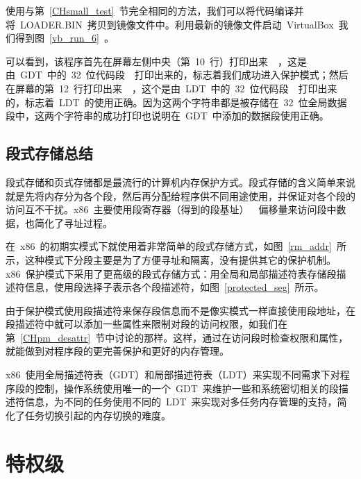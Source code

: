 使用与第~\ref{CHsmall_test}~节完全相同的方法，我们可以将代码编译并将~LOADER.BIN~拷贝到镜像文件中。利用最新的镜像文件启动~VirtualBox~我们得到图~\ref{vb_run_6}~。


可以看到，该程序首先在屏幕左侧中央（第~10~行）打印出来~~，这是由~GDT~中的~32~位代码段~~打印出来的，标志着我们成功进入保护模式；然后在屏幕的第~12~行打印出来~~，这个是由~LDT~中的~32~位代码段~~打印出来的，标志着~LDT~的使用正确。因为这两个字符串都是被存储在~32~位全局数据段中，这两个字符串的成功打印也说明在~GDT~中添加的数据段使用正确。

\subsection{段式存储总结}

段式存储和页式存储都是最流行的计算机内存保护方式。段式存储的含义简单来说就是先将内存分为各个段，然后再分配给程序供不同用途使用，并保证对各个段的访问互不干扰。x86~主要使用段寄存器（得到的段基址）~\code{+}~偏移量来访问段中数据，也简化了寻址过程。

在~x86~的初期实模式下就使用着非常简单的段式存储方式，如图~\ref{rm_addr}~所示，这种模式下分段主要是为了方便寻址和隔离，没有提供其它的保护机制。x86~保护模式下采用了更高级的段式存储方式：用全局和局部描述符表存储段描述符信息，使用段选择子表示各个段描述符，如图~\ref{protected_seg}~所示。

由于保护模式使用段描述符来保存段信息而不是像实模式一样直接使用段地址，在段描述符中就可以添加一些属性来限制对段的访问权限，如我们在第~\ref{CHpm_desattr}~节中讨论的那样。这样，通过在访问段时检查权限和属性，就能做到对程序段的更完善保护和更好的内存管理。

x86~使用全局描述符表（GDT）和局部描述符表（LDT）来实现不同需求下对程序段的控制，操作系统使用唯一的一个~GDT~来维护一些和系统密切相关的段描述符信息，为不同的任务使用不同的~LDT~来实现对多任务内存管理的支持，简化了任务切换引起的内存切换的难度。

\section{特权级}


